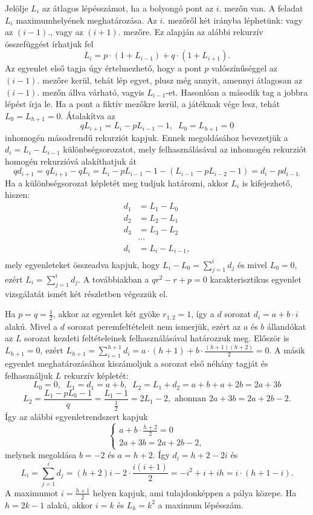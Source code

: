\begin{solution}
Jelölje $L_{i}$ az átlagos lépésszámot, ha a bolyongó pont az $i.$
mezőn van. A feladat $L_{i}$ maximumhelyének meghatározása. Az $i.$
mezőről két irányba léphetünk: vagy az $(i-1).$, vagy az $(i+1).$
mezőre. Ez alapján az alábbi rekurzív összefüggést írhatjuk fel 
\[
L_{i}=p\cdot(1+L_{i-1})+q\cdot(1+L_{i+1}).
\]
Az egyenlet első tagja úgy értelmezhető, hogy a pont $p$ valószínűséggel
az $(i-1).$ mezőre kerül, tehát lép egyet, plusz még annyit, amennyi
átlagosan az $(i-1).$ mezőn állva várható, vagyis $L_{i-1}$-et.
Hasonlóan a második tag a jobbra lépést írja le. Ha a pont a fiktív
mezőkre kerül, a játéknak vége lesz, tehát $L_{0}=L_{h+1}=0.$ Átalakítva
az 
\[
qL_{i+1}=L_{i}-pL_{i-1}-1,\phantom{a}L_{0}=L_{h+1}=0
\]
inhomogén másodrendű rekurziót kapjuk. Ennek megoldásához bevezetjük
a $d_{i}=L_{i}-L_{i-1}$ különbségsorozatot, mely felhasználásával
az inhomogén rekurziót homogén rekurzióvá alakíthatjuk át 
\[
qd_{i+1}=qL_{i+1}-qL_{i}=L_{i}-pL_{i-1}-1-(L_{i-1}-pL_{i-2}-1)=d_{i}-pd_{i-1.}
\]
Ha a különbségsorozat képletét meg tudjuk határozni, akkor $L_{i}$
is kifejezhető, hiszen: 
\begin{align*}
d_{1} & =L_{1}-L_{0}\\
d_{2} & =L_{2}-L_{1}\\
d_{3} & =L_{3}-L_{2}\\
 & \cdots\\
d_{i} & =L_{i}-L_{i-1},\\
\end{align*}
mely egyenleteket összeadva kapjuk, hogy $L_{i}-L_{0}=\sum\limits_{j=1}^{i}d_{j}$
és mivel $L_{0}=0$, ezért $L_{i}=\sum\limits_{j=1}^{i}d_{j}$. A
továbbiakban a $qr^{2}-r+p=0$ karakterisztikus egyenlet vizsgálatát
ismét két részletben végezzük el.

Ha $p=q=\frac{1}{2}$, akkor az egyenlet két gyöke $r_{1,2}=1$, így
a $d$ sorozat $d_{i}=a+b\cdot i$ alakú. Mivel a $d$ sorozat peremfeltételeit
nem ismerjük, ezért az $a$ és $b$ állandókat az $L$ sorozat kezdeti
feltételeinek felhasználásával határozzuk meg. Először is $L_{h+1}=0$,
ezért $L_{h+1}=\sum\limits_{i=1}^{h+1}d_{i}=a\cdot(h+1)+b\cdot\frac{(h+1)(h+2)}{2}=0$.
A másik egyenlet meghatározásához kiszámoljuk a sorozat első néhány
tagját és felhasználjuk $L$ rekurzív képletét: 
\[
L_{0}=0,\phantom{a}L_{1}=d_{1}=a+b,\phantom{a}L_{2}=L_{1}+d_{2}=a+b+a+2b=2a+3b
\]
\[
L_{2}=\frac{L_{1}-pL_{0}-1}{q}=\frac{L_{1}-1}{\frac{1}{2}}=2L_{1}-2,\phantom{i}\textrm{ahonnan}\phantom{i}2a+3b=2a+2b-2.
\]
Így az alábbi egyenletrendszert kapjuk 
\[
\left\{ \begin{array}{l}
a+b\cdot\frac{h+2}{2}=0\\
2a+3b=2a+2b-2,
\end{array}\right.
\]
melynek megoldása $b=-2$ és $a=h+2$. Így $d_{i}=h+2-2i$ és 
\[
L_{i}=\sum\limits_{j=1}^{i}d_{j}=(h+2)i-2\cdot\frac{i(i+1)}{2}=-i^{2}+i+ih=i\cdot(h+1-i).
\]
A maximumot $i=\frac{h+1}{2}$ helyen kapjuk, ami tulajdonképpen a
pálya közepe. Ha $h=2k-1$ alakú, akkor $i=k$ és $L_{k}=k^{2}$ a
maximum lépésszám.


\end{solution}

